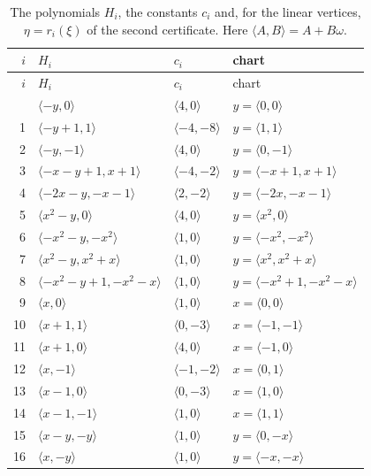 \documentclass[11pt]{article}
\begin{document}
\begingroup\small
\setlength{\LTcapwidth}{\textwidth}
\begin{longtable}{@{}rlll@{}}
\caption{The polynomials $H_i$, the constants $c_i$ and, for the linear vertices, $\eta=r_i(\xi)$ of the second certificate. Here $\langle A,B\rangle=A+B\omega$.}\label{tab:vert2}\\
\hline $i$ & $H_i$ & $c_i$ & chart\\\hline\endfirsthead\hline $i$ & $H_i$ & $c_i$ & chart\\\hline\endhead\hline\endfoot
0 & $\langle -y,0\rangle$ & $\langle 4,0\rangle$ & $y=\langle 0,0\rangle$\\
1 & $\langle -y+1,1\rangle$ & $\langle -4,-8\rangle$ & $y=\langle 1,1\rangle$\\
2 & $\langle -y,-1\rangle$ & $\langle 4,0\rangle$ & $y=\langle 0,-1\rangle$\\
3 & $\langle -x-y+1,x+1\rangle$ & $\langle -4,-2\rangle$ & $y=\langle -x+1,x+1\rangle$\\
4 & $\langle -2x-y,-x-1\rangle$ & $\langle 2,-2\rangle$ & $y=\langle -2x,-x-1\rangle$\\
5 & $\langle x^{2}-y,0\rangle$ & $\langle 4,0\rangle$ & $y=\langle x^{2},0\rangle$\\
6 & $\langle -x^{2}-y,-x^{2}\rangle$ & $\langle 1,0\rangle$ & $y=\langle -x^{2},-x^{2}\rangle$\\
7 & $\langle x^{2}-y,x^{2}+x\rangle$ & $\langle 1,0\rangle$ & $y=\langle x^{2},x^{2}+x\rangle$\\
8 & $\langle -x^{2}-y+1,-x^{2}-x\rangle$ & $\langle 1,0\rangle$ & $y=\langle -x^{2}+1,-x^{2}-x\rangle$\\
9 & $\langle x,0\rangle$ & $\langle 1,0\rangle$ & $x=\langle 0,0\rangle$\\
10 & $\langle x+1,1\rangle$ & $\langle 0,-3\rangle$ & $x=\langle -1,-1\rangle$\\
11 & $\langle x+1,0\rangle$ & $\langle 4,0\rangle$ & $x=\langle -1,0\rangle$\\
12 & $\langle x,-1\rangle$ & $\langle -1,-2\rangle$ & $x=\langle 0,1\rangle$\\
13 & $\langle x-1,0\rangle$ & $\langle 0,-3\rangle$ & $x=\langle 1,0\rangle$\\
14 & $\langle x-1,-1\rangle$ & $\langle 1,0\rangle$ & $x=\langle 1,1\rangle$\\
15 & $\langle x-y,-y\rangle$ & $\langle 1,0\rangle$ & $y=\langle 0,-x\rangle$\\
16 & $\langle x,-y\rangle$ & $\langle 1,0\rangle$ & $y=\langle -x,-x\rangle$\\

\end{longtable}
\end{document}
